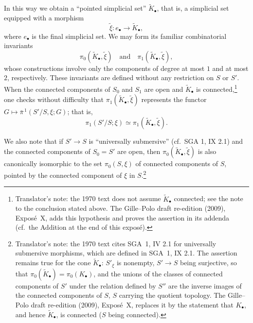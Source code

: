 In this way we obtain a ``pointed simplicial set'' \(\widetilde K_\bullet\),
that is, a simplicial set equipped with a morphism
\[
  \widetilde\xi:e_\bullet\longrightarrow\widetilde K_\bullet,
\]
where \(e_\bullet\) is the final simplicial set. We may form its familiar
combinatorial invariants
\[
  \pi_0(\widetilde K_\bullet,\widetilde\xi)
  \quad\text{and}\quad
  \pi_1(\widetilde K_\bullet,\widetilde\xi),
\]
whose constructions involve only the components of degree at most \(1\)
and at most \(2\), respectively. These invariants are defined without any
restriction on \(S\) or \(S'\). When the connected components of \(S_0\)
and \(S_1\) are open and \(\widetilde K_\bullet\) is
connected,\footnote{Translator's note: the 1970 text does not assume
\(\widetilde K_\bullet\) connected; see the note to the conclusion stated
above. The Gille--Polo draft re-edition (2009), Expos\'e~X, adds this
hypothesis and proves the assertion in its addenda (cf.\ the Addition at the
end of this exposé).} one checks without difficulty that
\(\pi_1(\widetilde K_\bullet,\widetilde\xi)\) represents the functor
\(G\mapsto\bar\pi^{\,1}(S'/S,\xi;G)\); that is,
\[
  \pi_1(S'/S;\xi)
  \simeq
  \pi_1(\widetilde K_\bullet,\widetilde\xi).
\]

We also note that if \(S'\to S\) is ``universally submersive''
(cf.\ SGA 1, IX 2.1) and the connected components of \(S_0=S'\) are open,
then \(\pi_0(\widetilde K_\bullet,\widetilde\xi)\) is also canonically
isomorphic to the set \(\pi_0(S,\xi)\) of connected components of \(S\),
pointed by the connected component of \(\xi\) in \(S\).\footnote{Translator's
note: the 1970 text cites SGA~1, IV 2.1 for universally submersive
morphisms, which are defined in SGA~1, IX 2.1. The assertion remains true for
the cone \(\widetilde K_\bullet\): \(S'_\xi\) is nonempty, \(S'\to S\) being
surjective, so that \(\pi_0(\widetilde K_\bullet)=\pi_0(K_\bullet)\), and the
unions of the classes of connected components of \(S'\) under the relation
defined by \(S''\) are the inverse images of the connected components of
\(S\), \(S\) carrying the quotient topology. The Gille--Polo draft re-edition
(2009), Expos\'e~X, replaces it by the statement that \(K_\bullet\), and hence
\(\widetilde K_\bullet\), is connected (\(S\) being connected).}

